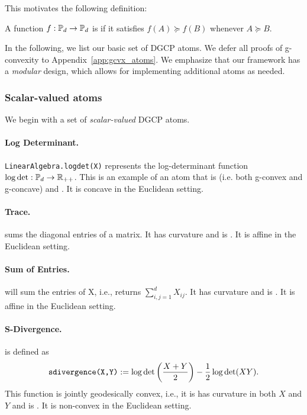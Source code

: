 \documentclass[twoside,11pt]{article}
\newcommand{\mw}[1]{\textcolor{blue}{\emph{MW: #1}}}
\begin{document}
This motivates the following definition:
\begin{definition}
    A function $f:\mathbb{P}_d \to \mathbb{P}_d$ 
    is  if it satisfies 
    $f(A) \succeq f(B)$
    whenever $A \succeq B$. 
\end{definition}
%
In the following, we list our basic set of DGCP atoms. We defer all proofs of g-convexity to Appendix~\ref{app:gcvx_atoms}. We emphasize that our framework has a \emph{modular} design, which allows for implementing additional atoms as needed. 

\subsubsection{Scalar-valued atoms}
We begin with a set of \textit{scalar-valued} DGCP atoms.
\paragraph{Log Determinant.}
 \texttt{LinearAlgebra.logdet(X)} represents the log-determinant function $\log \det: \mathbb{P}_d \to \mathbb{R}_{++}$. This is an example of an atom that is  (i.e. both g-convex and g-concave) and . It is concave in the Euclidean setting. 
 
\paragraph{Trace.}  sums the diagonal entries of a matrix. It has  curvature and is . It is affine in the Euclidean setting.

\paragraph{Sum of Entries.} 
 will sum the entries of X, i.e., returns $\sum_{i,j=1}^d X_{ij}$. It has  curvature and is . It is affine in the Euclidean setting.  

\paragraph{S-Divergence.}
 is defined as 
\begin{equation}\label{eq:sdiv}
    \texttt{sdivergence(X,Y)} := \log \det \left( \frac{X+Y}{2} \right) - \frac{1}{2}\log \det (XY).
\end{equation}
This function is jointly geodesically convex, i.e., it is has  curvature in both $X$ and $Y$ and is . It is non-convex in the Euclidean setting.
\end{document}
